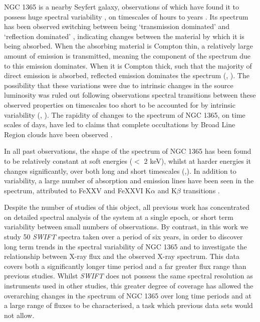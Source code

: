 \documentclass[letters,useAMS,usenatbib]{samnote}
\begin{document}
NGC 1365 is a nearby Seyfert galaxy, observations of which have found it to possess huge spectral variability \citep{risaliti09}, on timescales of hours to years
\citep{brenneman}. Its spectrum has been observed switching between being `transmission dominated' \citep{risaliti00} and `reflection dominated' \citep{iyomoyo},
indicating changes between the material by which it is being absorbed. When the absorbing material is Compton thin, a relatively large amount of emission is transmitted,
meaning the component of the spectrum due to this emission dominates. When it is Compton thick, such that the majority of direct emission is absorbed, reflected
emission dominates the spectrum (\citet{risaliti07b}, \citet{matt}). The possibility that these variations were due to intrinsic changes in the source luminosity was
ruled out following observations spectral transitions between these observed properties on timescales too short to be accounted for by intrinsic variability
(\citet{risaliti05a}, \citet{risaliti07b}). The rapidity of changes to the spectrum of NGC 1365, on time scales of days, have led to claims that complete occultations by
Broad Line Region clouds have been observed \citep{risaliti07a}.

In all past observations, the shape of the spectrum of NGC 1365 has been found to be relatively constant at soft energies ($<$ 2 keV),
whilst at harder energies it changes significantly, over both long and short timescales (\citep{risaliti07b},\citep{risaliti05b}). In addition to variability, 
a large number of absorption and emission lines have been seen in the spectrum, attributed to FeXXV and FeXXVI K$\alpha$ and K$\beta$ transitions \citep{risaliti05b}.

Despite the number of studies of this object, all previous work has concentrated on detailed spectral analysis of the system at a single epoch, or short term
variability between small numbers of observations. By contrast, in this work we study 50 {\it SWIFT} spectra taken over a period of six years, in order to discover long
term trends in the spectral variability of NGC 1365 and to investigate the relationship between X-ray flux and the observed X-ray spectrum. This data covers both a
significantly longer time period and a far greater flux range than previous studies. Whilst {\it SWIFT} does not possess the same spectral resolution as instruments used
in other studies, this greater degree of coverage has allowed the overarching changes in the spectrum of NGC 1365 over long time periods and at a large range of fluxes to
be characterised, a task which previous data sets would not allow.
\end{document}
